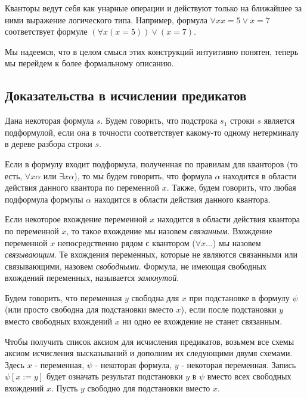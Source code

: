 Кванторы ведут себя как унарные операции и действуют только на ближайшее за
ними выражение логического типа. Например, формула $\forall x x = 5 \vee x = 7$
соответствует формуле $(\forall x (x=5)) \vee (x=7)$.

Мы надеемся, что в целом смысл этих конструкций интуитивно понятен, теперь
мы перейдем к более формальному описанию.

\subsection{Доказательства в исчислении предикатов}
\begin{definition}Дана некоторая формула $s$.
Будем говорить, что подстрока $s_1$ строки $s$ является подформулой, 
если она в точности соответствует какому-то одному нетерминалу
в дереве разбора строки $s$.\end{definition}

\begin{definition}Если в формулу входит подформула, полученная по правилам
для кванторов (то есть, $\forall x \alpha$ или $\exists x \alpha$), то 
мы будем говорить, что формула $\alpha$ находится в области действия 
данного квантора по переменной $x$. Также, будем говорить, что любая подформула 
формулы $\alpha$ находится в области действия данного квантора.
\end{definition}

\begin{definition}Если некоторое вхождение переменной $x$ находится
в области действия квантора по переменной $x$, то такое вхождение
мы назовем \emph{связанным}. Вхождение переменной $x$ непосредственно рядом 
с квантором ($\forall x \dots$) мы назовем \emph{связывающим}.
Те вхождения переменных, которые не являются связанными 
или связывающими, назовем \emph{свободными}. Формула, не имеющая 
свободных вхождений переменных, называется \emph{замкнутой}.
\end{definition}

\begin{definition}Будем говорить, что переменная $y$ свободна для $x$ 
при подстановке в формулу $\psi$ (или просто свободна для подстановки 
вместо $x$), если после подстановки $y$ вместо свободных вхождений $x$
ни одно ее вхождение не станет связанным.
\end{definition}

Чтобы получить список аксиом для исчисления предикатов, возьмем все схемы
аксиом исчисления высказываний и дополним их следующими двумя схемами.
Здесь $x$ - переменная, $\psi$ - некоторая формула, $y$ - некоторая переменная.
Запись $\psi[x := y]$ будет означать результат подстановки $y$ в $\psi$ вместо 
всех свободных вхождений $x$. Пусть $y$ свободно для подстановки вместо $x$.

